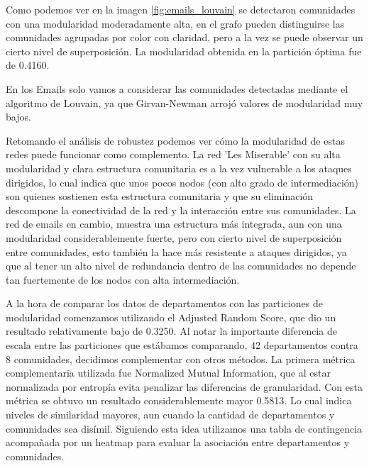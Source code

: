 \documentclass[conference]{IEEEtran}
\begin{document}
Como podemos ver en la imagen \ref{fig:emails_louvain} se detectaron comunidades con una modularidad moderadamente alta, en el grafo pueden distinguirse las comunidades agrupadas por color con claridad, pero a la vez se puede observar un cierto nivel de superposición. La modularidad obtenida en la partición óptima fue de 0.4160.

En los Emails solo vamos a considerar las comunidades detectadas mediante el algoritmo de Louvain, ya que Girvan-Newman arrojó valores de modularidad muy bajos.

Retomando el análisis de robustez podemos ver cómo la modularidad de estas redes puede funcionar como complemento. La red 'Les Miserable' con su alta modularidad y clara estructura comunitaria es a la vez vulnerable a los ataques dirigidos, lo cual indica que unos pocos nodos (con alto grado de intermediación) son quienes sostienen esta estructura comunitaria y que su eliminación descompone la conectividad de la red y la interacción entre sus comunidades. 
La red de emails en cambio, muestra una estructura más integrada, aun con una modularidad considerablemente fuerte, pero con cierto nivel de superposición entre comunidades, esto también la hace más resistente a ataques dirigidos, ya que al tener un alto nivel de redundancia dentro de las comunidades no depende tan fuertemente de los nodos con alta intermediación.

A la hora de comparar los datos de departamentos con las particiones de modularidad comenzamos utilizando el Adjusted Random Score, que dio un resultado relativamente bajo de 0.3250. Al notar la importante diferencia de escala entre las particiones que estábamos comparando, 42 departamentos contra 8 comunidades, decidimos complementar con otros métodos.
La primera métrica complementaria utilizada fue Normalized Mutual Information, que al estar normalizada por entropía evita penalizar las diferencias de granularidad. Con esta métrica se obtuvo un resultado considerablemente mayor 0.5813. Lo cual indica niveles de similaridad mayores, aun cuando la cantidad de departamentos y comunidades sea disímil.
Siguiendo esta idea utilizamos una tabla de contingencia acompañada por un heatmap para evaluar la asociación entre departamentos y comunidades.
\end{document}

